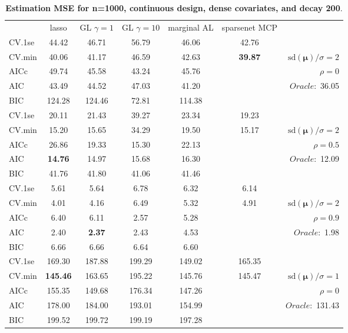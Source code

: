 \begin{table}\vspace{-.5cm}
\caption[l]{ { \bf Estimation MSE for n=1000, continuous design, 
dense covariates, and  decay  200}.}
\vspace{-.5cm}
\footnotesize{}
\begin{center}
\begin{tabular}{l*{5}{c}|r}
& lasso & GL $\gamma=1$ & GL $\gamma=10$ & marginal AL & sparsenet MCP  & \\
 \cline{1-7}
CV.1se & 44.42 & 46.71 & 56.79 & 46.06 & 42.76 & \\
CV.min & 40.06 & 41.17 & 46.59 & 42.63 & {\bf 39.87} &  $\mathrm{sd}(\mathbf{\mu})/\sigma=2$ \\
AICc & 49.74 & 45.58 & 43.24 & 45.76 & & $\rho=0$ \\
AIC & 43.49 & 44.52 & 47.03 & 41.20 & &  \multirow{2}{*}{$Oracle: $ 36.05} \\
BIC & 124.28 & 124.46 & 72.81 & 114.38 & &  \\
 \hline 
CV.1se & 20.11 & 21.43 & 39.27 & 23.34 & 19.23 & \\
CV.min & 15.20 & 15.65 & 34.29 & 19.50 & 15.17 &  $\mathrm{sd}(\mathbf{\mu})/\sigma=2$ \\
AICc & 26.86 & 19.33 & 15.30 & 22.13 & & $\rho=0.5$ \\
AIC & {\bf 14.76} & 14.97 & 15.68 & 16.30 & &  \multirow{2}{*}{$Oracle: $ 12.09} \\
BIC & 41.76 & 41.80 & 41.06 & 41.46 & &  \\
 \hline 
CV.1se & 5.61 & 5.64 & 6.78 & 6.32 & 6.14 & \\
CV.min & 4.01 & 4.16 & 6.49 & 5.32 & 4.91 &  $\mathrm{sd}(\mathbf{\mu})/\sigma=2$ \\
AICc & 6.40 & 6.11 & 2.57 & 5.28 & & $\rho=0.9$ \\
AIC & 2.40 & {\bf 2.37} & 2.43 & 4.53 & &  \multirow{2}{*}{$Oracle: $ 1.98} \\
BIC & 6.66 & 6.66 & 6.64 & 6.60 & &  \\
 \hline 
CV.1se & 169.30 & 187.88 & 199.29 & 149.02 & 165.35 & \\
CV.min & {\bf 145.46} & 163.65 & 195.22 & 145.76 & 145.47 &  $\mathrm{sd}(\mathbf{\mu})/\sigma=1$ \\
AICc & 155.35 & 149.68 & 176.34 & 147.26 & & $\rho=0$ \\
AIC & 178.00 & 184.00 & 193.01 & 154.99 & &  \multirow{2}{*}{$Oracle: $ 131.43} \\
BIC & 199.52 & 199.72 & 199.19 & 197.28 & &  \\

\end{tabular}
\end{center}
\end{table}
